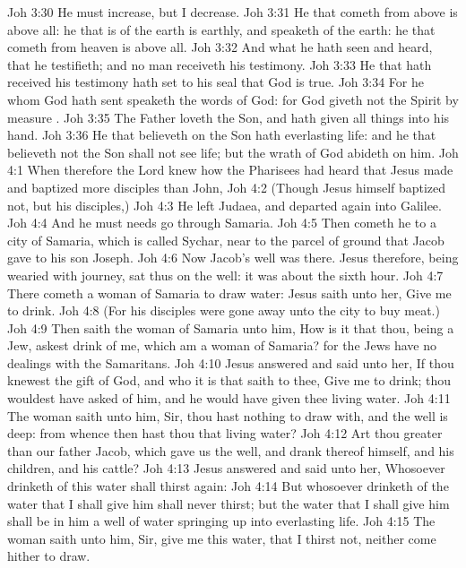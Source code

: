 \vs Joh 3:30 He must increase, but I  decrease.
\vs Joh 3:31 He that cometh from above is above all: he that is of the earth is earthly, and speaketh of the earth: he that cometh from heaven is above all.
\vs Joh 3:32 And what he hath seen and heard, that he testifieth; and no man receiveth his testimony.
\vs Joh 3:33 He that hath received his testimony hath set to his seal that God is true.
\vs Joh 3:34 For he whom God hath sent speaketh the words of God: for God giveth not the Spirit by measure .
\vs Joh 3:35 The Father loveth the Son, and hath given all things into his hand.
\vs Joh 3:36 He that believeth on the Son hath everlasting life: and he that believeth not the Son shall not see life; but the wrath of God abideth on him.
\vs Joh 4:1 When therefore the Lord knew how the Pharisees had heard that Jesus made and baptized more disciples than John,
\vs Joh 4:2 (Though Jesus himself baptized not, but his disciples,)
\vs Joh 4:3 He left Judaea, and departed again into Galilee.
\vs Joh 4:4 And he must needs go through Samaria.
\vs Joh 4:5 Then cometh he to a city of Samaria, which is called Sychar, near to the parcel of ground that Jacob gave to his son Joseph.
\vs Joh 4:6 Now Jacob's well was there. Jesus therefore, being wearied with  journey, sat thus on the well:  it was about the sixth hour.
\vs Joh 4:7 There cometh a woman of Samaria to draw water: Jesus saith unto her, Give me to drink.
\vs Joh 4:8 (For his disciples were gone away unto the city to buy meat.)
\vs Joh 4:9 Then saith the woman of Samaria unto him, How is it that thou, being a Jew, askest drink of me, which am a woman of Samaria? for the Jews have no dealings with the Samaritans.
\vs Joh 4:10 Jesus answered and said unto her, If thou knewest the gift of God, and who it is that saith to thee, Give me to drink; thou wouldest have asked of him, and he would have given thee living water.
\vs Joh 4:11 The woman saith unto him, Sir, thou hast nothing to draw with, and the well is deep: from whence then hast thou that living water?
\vs Joh 4:12 Art thou greater than our father Jacob, which gave us the well, and drank thereof himself, and his children, and his cattle?
\vs Joh 4:13 Jesus answered and said unto her, Whosoever drinketh of this water shall thirst again:
\vs Joh 4:14 But whosoever drinketh of the water that I shall give him shall never thirst; but the water that I shall give him shall be in him a well of water springing up into everlasting life.
\vs Joh 4:15 The woman saith unto him, Sir, give me this water, that I thirst not, neither come hither to draw.
